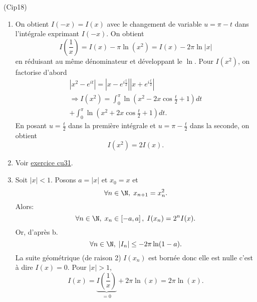 \begin{tiny}(Cip18)\end{tiny} 
\begin{enumerate}
 \item On obtient $I(-x) = I(x)$ avec le changement de variable $u = \pi -t$ dans l'intégrale exprimant $I(-x)$.\newline
 On obtient 
 \[
 I(\frac{1}{x}) = I(x) -\pi\ln(x^2) = I(x) -2\pi \ln|x| 
 \]
en réduisant au même dénominateur et développant le $\ln$. Pour $I(x^2)$, on factorise d'abord
\begin{multline*}
 \left| x^2 - e^{it}\right| = \left| x - e^{i\frac{t}{2}}\right| \left| x + e^{i\frac{t}{2}}\right|\\
 \Rightarrow I(x^2)
 = \int_{0}^{\pi }\ln (x^{2} - 2x\cos\frac{t}{2} +1)dt \\ 
 + \int_{0}^{\pi }\ln (x^{2}+ 2x\cos\frac{t}{2} + 1)dt.
\end{multline*}
En posant $u=\frac{t}{2}$ dans la première intégrale et $u = \pi - \frac{t}{2}$ dans la seconde, on obtient
\[
 I(x^2) = 2I(x).
\]

 \item Voir \href{\baseurl temptex/fexcu.pdf}{exercice cu31}.

 \item
 Soit $|x|<1$. Posons $a = |x|$ et $x_0 = x$ et 
\[
 \forall n \in \N, \; x_{n+1} = x_n^2. 
\]
Alors:
\[
\forall n \in \N,\; x_n\in \left[ -a,a\right],\;
I(x_n) = 2^nI(x).
\]
Or, d'après b.
\[
\forall n \in \N,\; |I_n| \leq -2\pi \ln(1-a).
\]
La suite géométrique (de raison 2) $I(x_n)$ est bornée donc elle est nulle c'est à dire $I(x)=0$. Pour $|x|>1$,
\[
 I(x) = \underset{=0}{\underbrace{I(\frac{1}{x})}} + 2\pi\ln(x) = 2\pi\ln(x).
\]

\end{enumerate}

